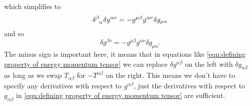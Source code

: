 \documentclass[fleqn]{NotesClass}
\begin{document}
    which simplifies to
    \begin{equation}
        \tensor{\delta}{^\beta_\alpha} \delta g^{\alpha\nu} = - g^{\mu\beta} g^{\alpha\nu} \delta g_{\mu \alpha}
    \end{equation}
    and so
    \begin{equation}
        \delta g^{\beta\nu} = - g^{\mu\beta} g^{\alpha\nu} \delta g_{\mu \alpha}.
    \end{equation}
    The minus sign is important here, it means that in equations like \cref{eqn:defining property of energy momentum tensor} we can replace \(\delta g^{\alpha\beta}\) on the left with \(\delta g_{\alpha\beta}\) as long as we swap \(T_{\alpha\beta}\) for \(-T^{\alpha\beta}\) on the right.
    This means we don't have to specify any derivatives with respect to \(g^{\alpha\beta}\), just the derivatives with respect to \(g_{\alpha\beta}\) in \cref{eqn:defining property of energy momentum tensor} are sufficient.
    
\end{document}
